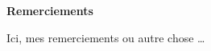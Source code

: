 \begin{center}\bfseries\Huge
    Remerciements
\end{center}
Ici, mes remerciements ou autre chose \ldots